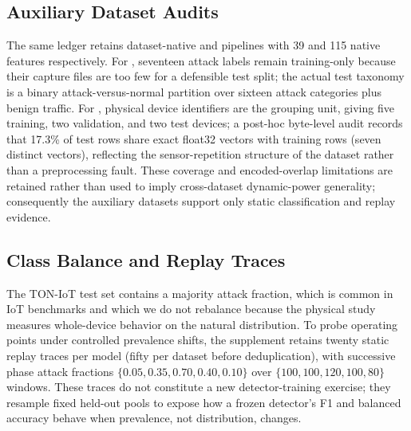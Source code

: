 \subsection{Auxiliary Dataset Audits}
The same ledger retains dataset-native \cic{} and \nb{} pipelines with 39 and 115 native features respectively. For \cic{}, seventeen attack labels remain training-only because their capture files are too few for a defensible test split; the actual test taxonomy is a binary attack-versus-normal partition over sixteen attack categories plus benign traffic. For \nb{}, physical device identifiers are the grouping unit, giving five training, two validation, and two test devices; a post-hoc byte-level audit records that 17.3\% of \nb{} test rows share exact float32 vectors with training rows (seven distinct vectors), reflecting the sensor-repetition structure of the dataset rather than a preprocessing fault. These coverage and encoded-overlap limitations are retained rather than used to imply cross-dataset dynamic-power generality; consequently the auxiliary datasets support only static classification and replay evidence.

\subsection{Class Balance and Replay Traces}
The TON-IoT test set contains a majority attack fraction, which is common in IoT benchmarks and which we do not rebalance because the physical study measures whole-device behavior on the natural distribution. To probe operating points under controlled prevalence shifts, the supplement retains twenty static replay traces per model (fifty per dataset before deduplication), with successive phase attack fractions $\{0.05, 0.35, 0.70, 0.40, 0.10\}$ over $\{100, 100, 120, 100, 80\}$ windows. These traces do not constitute a new detector-training exercise; they resample fixed held-out pools to expose how a frozen detector's F1 and balanced accuracy behave when prevalence, not distribution, changes.
